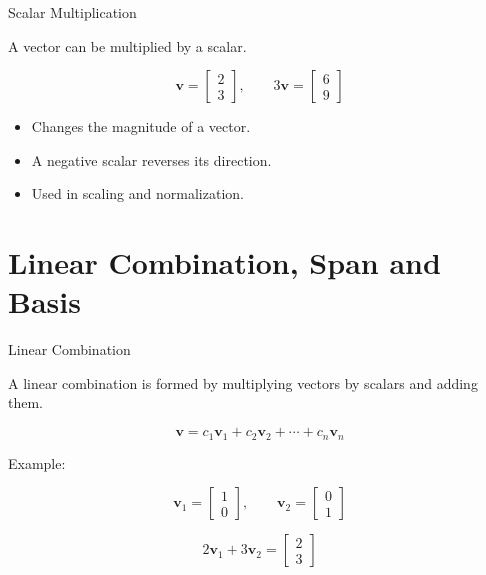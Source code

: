 \documentclass[aspectratio=169]{beamer}
\begin{document}
\begin{frame}{Scalar Multiplication}
\small

A vector can be multiplied by a scalar.

$$
\mathbf{v}=
\begin{bmatrix}
2\\
3
\end{bmatrix},
\qquad
3\mathbf{v}
=
\begin{bmatrix}
6\\
9
\end{bmatrix}
$$

\begin{itemize}
\item Changes the magnitude of a vector.
\item A negative scalar reverses its direction.
\item Used in scaling and normalization.
\end{itemize}

\end{frame}

\section{Linear Combination, Span and Basis}

\begin{frame}{Linear Combination}
\small

A linear combination is formed by multiplying vectors by scalars and adding them.

$$
\mathbf{v}
=
c_1\mathbf{v}_1+
c_2\mathbf{v}_2+\cdots+c_n\mathbf{v}_n
$$

Example:

$$
\mathbf{v}_1=
\begin{bmatrix}
1\\
0
\end{bmatrix},
\qquad
\mathbf{v}_2=
\begin{bmatrix}
0\\
1
\end{bmatrix}
$$

$$
2\mathbf{v}_1+3\mathbf{v}_2
=
\begin{bmatrix}
2\\
3
\end{bmatrix}
$$

\end{frame}
\end{document}
